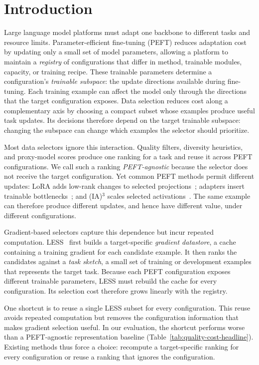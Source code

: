 \section{Introduction}

Large language model platforms must adapt one backbone to different tasks and resource limits. Parameter-efficient fine-tuning (PEFT) reduces adaptation cost by updating only a small set of model parameters, allowing a platform to maintain a \emph{registry} of configurations that differ in method, trainable modules, capacity, or training recipe. These trainable parameters determine a configuration's \emph{trainable subspace}: the update directions available during fine-tuning. Each training example can affect the model only through the directions that the target configuration exposes. Data selection reduces cost along a complementary axis by choosing a compact subset whose examples produce useful task updates. Its decisions therefore depend on the target trainable subspace: changing the subspace can change which examples the selector should prioritize.

Most data selectors ignore this interaction. Quality filters, diversity heuristics, and proxy-model scores produce one ranking for a task and reuse it across PEFT configurations. We call such a ranking \emph{PEFT-agnostic} because the selector does not receive the target configuration. Yet common PEFT methods permit different updates: LoRA adds low-rank changes to selected projections~\cite{hu2022lora}; adapters insert trainable bottlenecks~\cite{houlsby2019adapters}; and (IA)$^3$ scales selected activations~\cite{liu2022ia3}. The same example can therefore produce different updates, and hence have different value, under different configurations.

Gradient-based selectors capture this dependence but incur repeated computation. LESS~\cite{xia2024less} first builds a target-specific \emph{gradient datastore}, a cache containing a training gradient for each candidate example. It then ranks the candidates against a \emph{task sketch}, a small set of training or development examples that represents the target task. Because each PEFT configuration exposes different trainable parameters, LESS must rebuild the cache for every configuration. Its selection cost therefore grows linearly with the registry.

One shortcut is to reuse a single LESS subset for every configuration. This reuse avoids repeated computation but removes the configuration information that makes gradient selection useful. In our evaluation, the shortcut performs worse than a PEFT-agnostic representation baseline (Table~\ref{tab:quality-cost-headline}). Existing methods thus force a choice: recompute a target-specific ranking for every configuration or reuse a ranking that ignores the configuration.

